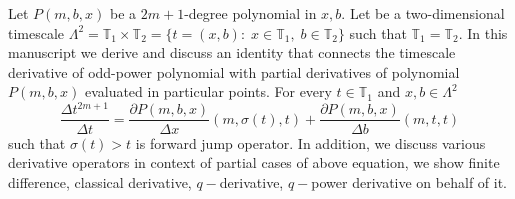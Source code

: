 Let $P(m,b,x)$ be a $2m+1$-degree polynomial in $x,b$.
Let be a two-dimensional timescale
$\Lambda^2 = \mathbb{T}_1 \times \mathbb{T}_2 = \{t=(x, b) \colon \; x\in\mathbb{T}_1, \; b\in\mathbb{T}_2 \}$
such that $\mathbb{T}_1 = \mathbb{T}_2$.
In this manuscript we derive and discuss an identity that connects the timescale derivative of odd-power polynomial
with partial derivatives of polynomial $P(m,b,x)$ evaluated in particular points.
For every $t\in\mathbb{T}_1$ and $x,b\in \Lambda^2$
\[
    \frac{\Delta t^{2m+1}}{\Delta t} =
    \frac{\partial P(m,b,x)}{\Delta x} (m, \sigma(t), t) +
    \frac{\partial P(m,b,x)}{\Delta b} (m, t, t)
\]
such that $\sigma(t) > t$ is forward jump operator.
In addition, we discuss various derivative operators in context of partial cases of above equation,
we show finite difference, classical derivative, $q-$derivative, $q-$power derivative on behalf of it.
